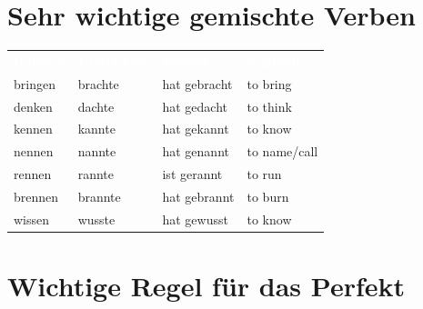 \documentclass[a4paper,11pt]{article}
\begin{document}
    
    \section{Sehr wichtige gemischte Verben}
        
        \begin{tabular}{>{\raggedright\arraybackslash}p{3.5cm} >{\raggedright\arraybackslash}p{3.5cm} >{\raggedright\arraybackslash}p{4cm} >{\raggedright\arraybackslash}p{3.5cm}}
            \rowcolor{HeaderBlueDark}
            \textcolor{white}{\textbf{Infinitiv}} &
            \textcolor{white}{\textbf{Präteritum}} &
            \textcolor{white}{\textbf{Perfekt}} &
            \textcolor{white}{\textbf{Englisch}} \\
            
            \rowcolor{RowBlueLight}
            bringen &
            brachte &
            hat gebracht &
            to bring \\
            
            \rowcolor{RowBlueDark}
            denken &
            dachte &
            hat gedacht &
            to think \\
            
            \rowcolor{RowBlueLight}
            kennen &
            kannte &
            hat gekannt &
            to know \\
            
            \rowcolor{RowBlueDark}
            nennen &
            nannte &
            hat genannt &
            to name/call \\
            
            \rowcolor{RowBlueLight}
            rennen &
            rannte &
            ist gerannt &
            to run \\
            
            \rowcolor{RowBlueDark}
            brennen &
            brannte &
            hat gebrannt &
            to burn \\
            
            \rowcolor{RowBlueLight}
            wissen &
            wusste &
            hat gewusst &
            to know \\
        \end{tabular}
    
    
    \section{Wichtige Regel für das Perfekt}
        
\end{document}
